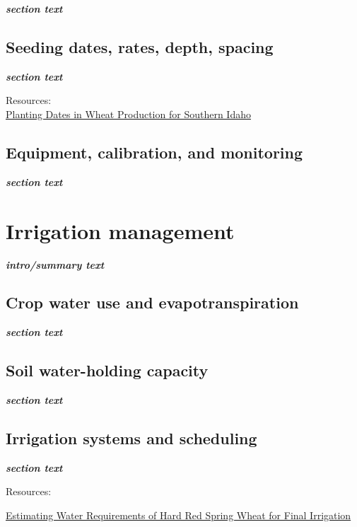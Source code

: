 \documentclass[
  letterpaper,
  DIV=11,
  numbers=noendperiod]{scrreprt}
\begin{document}
\textbf{\emph{section text}}

\section{Seeding dates, rates, depth,
spacing}\label{seeding-dates-rates-depth-spacing}

\textbf{\emph{section text}}

Resources:\\
\href{https://content-hub.uidaho.edu/api/public/content/62b0b1bc3bc1444b896fa312ca84bc10?v=1e2d120f}{Planting
Dates in Wheat Production for Southern Idaho}

\section{Equipment, calibration, and
monitoring}\label{equipment-calibration-and-monitoring}

\textbf{\emph{section text}}


\chapter{Irrigation management}\label{irrigation-management}

\textbf{\emph{intro/summary text}}

\section{Crop water use and
evapotranspiration}\label{crop-water-use-and-evapotranspiration}

\textbf{\emph{section text}}

\section{Soil water-holding capacity}\label{soil-water-holding-capacity}

\textbf{\emph{section text}}

\section{Irrigation systems and
scheduling}\label{irrigation-systems-and-scheduling}

\textbf{\emph{section text}}

Resources:

\href{https://www.uidaho.edu/-/media/uidaho-responsive/files/extension/publications/bul/bul0833.pdf}{Estimating
Water Requirements of Hard Red Spring Wheat for Final Irrigation}
\end{document}
